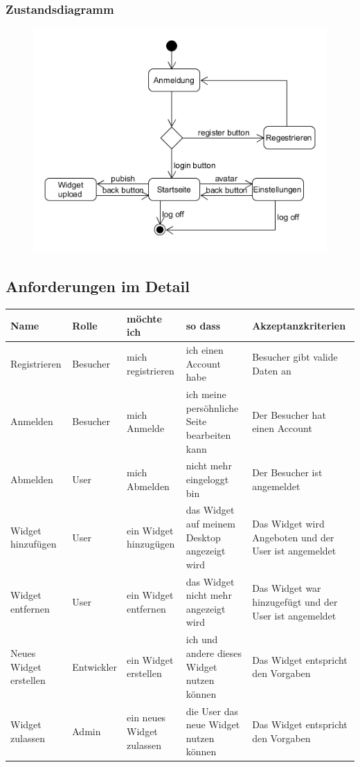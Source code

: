 		\subsubsection{Zustandsdiagramm}
			\begin{figure}[H]
				\includegraphics[scale=0.8]{images/zustand}
			\end{figure}
	
	\subsection{Anforderungen im Detail}
		
		\begin{center}
			\begin{tabular}{ | p{2cm} | p{2cm} | p{3cm} | p{3cm} | p{4cm} |}
				\hline
				\textbf{Name} & \textbf{Rolle} & \textbf{möchte ich} & \textbf{so dass} & \textbf{Akzeptanzkriterien}\\ \hline
				Registrieren & Besucher & mich registrieren & ich einen Account habe & Besucher gibt valide Daten an \\  \hline
				Anmelden & Besucher & mich Anmelde & ich meine persöhnliche \newline Seite bearbeiten kann & Der Besucher hat einen Account \\  \hline
				Abmelden & User & mich Abmelden & nicht mehr eingeloggt bin & Der Besucher ist angemeldet \\ \hline
				Widget hinzufügen & User & ein Widget hinzugügen & das Widget auf meinem Desktop angezeigt wird & Das Widget wird Angeboten und der User ist angemeldet \\ \hline
				Widget entfernen & User & ein Widget entfernen & das Widget nicht mehr angezeigt wird & Das Widget war hinzugefügt und der User ist angemeldet \\ \hline
				Neues Widget erstellen & Entwickler & ein Widget erstellen & ich und andere dieses Widget nutzen können & Das Widget entspricht den Vorgaben \\ \hline
				Widget zulassen & Admin & ein neues Widget zulassen & die User das neue Widget nutzen können & Das Widget entspricht den Vorgaben \\				
				\hline
			\end{tabular}
		\end{center}

